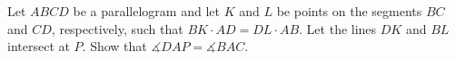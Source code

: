 Let $ABCD$ be a parallelogram and let $K$ and $L$ be points on the segments $BC$ and $CD$, respectively, such that $BK\cdot AD=DL\cdot AB$. Let the lines $DK$ and $BL$ intersect at $P$. Show that $\measuredangle DAP=\measuredangle BAC$.
